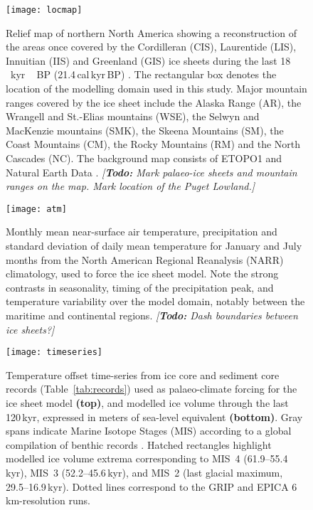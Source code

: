 \documentclass[tc, manuscript]{copernicus}
\newcommand{\todo}[1]{\emph{[\textbf{Todo:} #1]}}
\begin{document}
\begin{figure}
  \texttt{[image: locmap]}
  \caption{Relief map of northern North America showing a reconstruction of the
           areas once covered by the Cordilleran (CIS), Laurentide (LIS),
           Innuitian (IIS) and Greenland (GIS) ice sheets during the last
           18\,\unit{\,kyr\,BP} (21.4\,cal\,kyr\,BP)
           \citep{Dyke.2004}. The rectangular box denotes the location of the
           modelling domain used in this study. Major mountain ranges covered
           by the ice sheet include the Alaska Range (AR), the Wrangell and
           St.-Elias mountains (WSE), the Selwyn and MacKenzie mountains (SMK),
           the Skeena Mountains (SM), the Coast Mountains (CM), the Rocky
           Mountains (RM) and the North Cascades (NC). The background
           map consists of ETOPO1 \citep{Amante.Eakins.2009} and Natural Earth
           Data \citep{Patterson.Kelso.2014}.
           \todo{Mark palaeo-ice sheets and mountain ranges on the map.
                 Mark location of the Puget Lowland.}}
  \label{fig:locmap}
\end{figure}

\begin{figure}
  \texttt{[image: atm]}
  \caption{Monthly mean near-surface air temperature, precipitation and
           standard deviation of daily mean temperature for January and July
           months from the North American Regional Reanalysis (NARR)
           climatology, used to force the ice sheet model. Note the
           strong contrasts in seasonality, timing of the precipitation peak,
           and temperature variability over the model domain, notably between
           the maritime and continental regions.
           \todo{Dash boundaries between ice sheets?}}
  \label{fig:atm}
\end{figure}

\begin{figure*}
  \texttt{[image: timeseries]}
  \caption{Temperature offset time-series from ice core and sediment core
           records (Table~\ref{tab:records}) used as palaeo-climate forcing for
           the ice sheet model \textbf{(top)}, and modelled ice volume
           through the last 120\,kyr, expressed in meters of sea-level
           equivalent \textbf{(bottom)}. Gray spans indicate Marine Isotope
           Stages (MIS) according to a global compilation of benthic
            records \citep{Lisiecki.Raymo.2005}. Hatched
           rectangles highlight modelled ice volume extrema corresponding to
           MIS~4 (61.9--55.4\,kyr), MIS~3 (52.2--45.6\,kyr), and
           MIS~2 (last glacial maximum, 29.5--16.9\,kyr). Dotted lines
           correspond to the GRIP and EPICA 6\,km-resolution runs.}
  \label{fig:timeseries}
\end{figure*}
\end{document}
